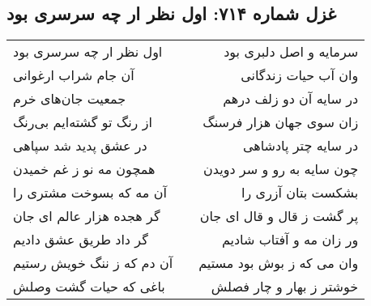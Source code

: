 \begin{center}
\section*{غزل شماره ۷۱۴: اول نظر ار چه سرسری بود}
\label{sec:0714}
\begin{longtable}{l p{0.5cm} r}
اول نظر ار چه سرسری بود
&&
سرمایه و اصل دلبری بود
\\
آن جام شراب ارغوانی
&&
وان آب حیات زندگانی
\\
جمعیت جان‌های خرم
&&
در سایه آن دو زلف درهم
\\
از رنگ تو گشته‌ایم بی‌رنگ
&&
زان سوی جهان هزار فرسنگ
\\
در عشق پدید شد سپاهی
&&
در سایه چتر پادشاهی
\\
همچون مه نو ز غم خمیدن
&&
چون سایه به رو و سر دویدن
\\
آن مه که بسوخت مشتری را
&&
بشکست بتان آزری را
\\
گر هجده هزار عالم ای جان
&&
پر گشت ز قال و قال ای جان
\\
گر داد طریق عشق دادیم
&&
ور زان مه و آفتاب شادیم
\\
آن دم که ز ننگ خویش رستیم
&&
وان می که ز بوش بود مستیم
\\
باغی که حیات گشت وصلش
&&
خوشتر ز بهار و چار فصلش
\\
\end{longtable}
\end{center}
